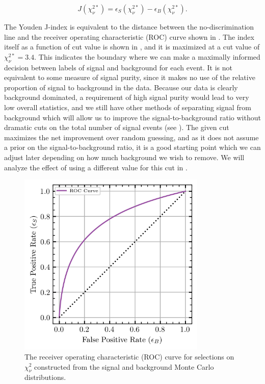 \begin{equation}
  J(\chi^{2*}_\nu) = \epsilon_S(\chi^{2*}_\nu) - \epsilon_B(\chi^{2*}_\nu).
  \label{eq:youden-j}
\end{equation}

The Youden J-index is equivalent to the distance between the no-discrimination line and the receiver operating characteristic (ROC) curve shown in . The index itself as a function of cut value is shown in , and it is maximized at a cut value of $\chi^{2*}_\nu = 3.4$. This indicates the boundary where we can make a maximally informed decision between labels of signal and background for each event. It is not equivalent to some measure of signal purity, since it makes no use of the relative proportion of signal to background in the data. Because our data is clearly background dominated, a requirement of high signal purity would lead to very low overall statistics, and we still have other methods of separating signal from background which will allow us to improve the signal-to-background ratio without dramatic cuts on the total number of signal events (see ). The given cut maximizes the net improvement over random guessing, and as it does not assume a prior on the signal-to-background ratio, it is a good starting point which we can adjust later depending on how much background we wish to remove. We will analyze the effect of using a different value for this cut in .

\begin{figure}
  \begin{center}
    \includegraphics[width=0.8\textwidth]{figures/data_combined_chisqdof_roc.png}
  \end{center}
  \caption{The receiver operating characteristic (ROC) curve for selections on $\chi^2_\nu$ constructed from the signal and background Monte Carlo distributions.}\label{fig:data-combined-chisqdof-roc}
\end{figure}

